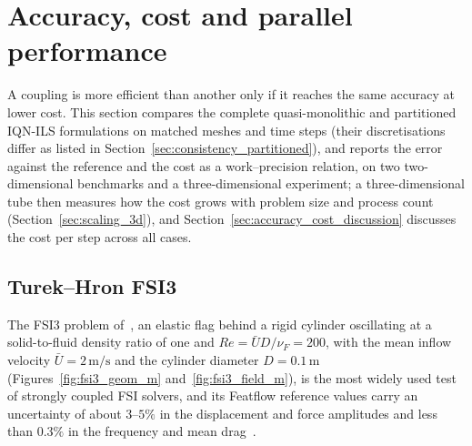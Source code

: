 \section{Accuracy, cost and parallel performance}\label{sec:accuracy_cost}

A coupling is more efficient than another only if it reaches the same accuracy at lower cost.
This section compares the complete quasi-monolithic and partitioned IQN-ILS formulations on matched meshes and time steps (their discretisations differ as listed in Section~\ref{sec:consistency_partitioned}), and reports the error against the reference and the cost as a work--precision relation, on two two-dimensional benchmarks and a three-dimensional experiment; a three-dimensional tube then measures how the cost grows with problem size and process count (Section~\ref{sec:scaling_3d}), and Section~\ref{sec:accuracy_cost_discussion} discusses the cost per step across all cases.

\subsection{Turek--Hron FSI3}\label{sec:fsi3_m}

The FSI3 problem of~\citet{Turek2006}, an elastic flag behind a rigid cylinder oscillating at a solid-to-fluid density ratio of one and $Re = \bar{U}D/\nu_F = 200$, with the mean inflow velocity $\bar{U} = 2\,\mathrm{m/s}$ and the cylinder diameter $D = 0.1\,\mathrm{m}$ (Figures~\ref{fig:fsi3_geom_m} and~\ref{fig:fsi3_field_m}), is the most widely used test of strongly coupled FSI solvers, and its Featflow reference values carry an uncertainty of about $3$--$5\%$ in the displacement and force amplitudes and less than $0.3\%$ in the frequency and mean drag~\citep{CardiffFSIVerification2026}.

